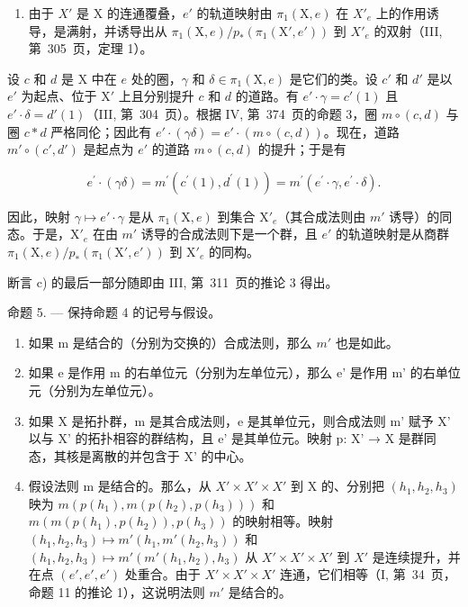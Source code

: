 \begin{enumerate}
\def\labelenumi{\alph{enumi})}
\setcounter{enumi}{2}
\tightlist
\item
  由于 \(X'\) 是 X 的连通覆叠，\(e'\) 的轨道映射由 \(\pi_{1}(\mathrm{X},e)\) 在 \(X'_{e}\) 上的作用诱导，是满射，并诱导出从 \(\pi_{1}(\mathrm{X},e)/p_{*}(\pi_{1}(\mathrm{X}',e'))\) 到 \(X'_{e}\) 的双射（III, 第~305~页，定理 1）。
\end{enumerate}

设 \(c\) 和 \(d\) 是 X 中在 \(e\) 处的圈，\(\gamma\) 和 \(\delta \in \pi_1(\mathrm{X},e)\) 是它们的类。设 \(c'\) 和 \(d'\) 是以 \(e'\) 为起点、位于 \(\mathrm{X}'\) 上且分别提升 \(c\) 和 \(d\) 的道路。有 \(e' \cdot \gamma = c'(1)\) 且 \(e' \cdot \delta = d'(1)\)（III, 第~304~页）。根据 IV, 第~374~页的命题 3，圈 \(m \circ (c,d)\) 与圈 \(c*d\) 严格同伦；因此有 \(e' \cdot (\gamma\delta) = e' \cdot (m \circ (c,d))\)。现在，道路 \(m' \circ (c',d')\) 是起点为 \(e'\) 的道路 \(m \circ (c,d)\) 的提升；于是有

\[
e ^ {\prime} \cdot (\gamma \delta) = m ^ {\prime} (c ^ {\prime} (1), d ^ {\prime} (1)) = m ^ {\prime} (e ^ {\prime} \cdot \gamma , e ^ {\prime} \cdot \delta).
\]

因此，映射 \(\gamma \mapsto e' \cdot \gamma\) 是从 \(\pi_1(\mathrm{X}, e)\) 到集合 \(\mathrm{X}'_e\)（其合成法则由 \(m'\) 诱导）的同态。于是，\(\mathrm{X}'_e\) 在由 \(m'\) 诱导的合成法则下是一个群，且 \(e'\) 的轨道映射是从商群 \(\pi_1(\mathrm{X}, e)/p_*(\pi_1(\mathrm{X}', e'))\) 到 \(\mathrm{X}'_e\) 的同构。

断言 c) 的最后一部分随即由 III, 第~311~页的推论 3 得出。

命题 5. --- 保持命题 4 的记号与假设。

\begin{enumerate}
\def\labelenumi{\alph{enumi})}
\item
  如果 m 是结合的（分别为交换的）合成法则，那么 \(m'\) 也是如此。
\item
  如果 e 是作用 m 的右单位元（分别为左单位元），那么 e' 是作用 m' 的右单位元（分别为左单位元）。
\item
  如果 X 是拓扑群，m 是其合成法则，e 是其单位元，则合成法则 m' 赋予 X' 以与 X' 的拓扑相容的群结构，且 e' 是其单位元。映射 p: X' → X 是群同态，其核是离散的并包含于 X' 的中心。
\item
  假设法则 m 是结合的。那么，从 \(X' \times X' \times X'\) 到 X 的、分别把 \((h_{1}, h_{2}, h_{3})\) 映为 \(m(p(h_{1}),m(p(h_{2}),p(h_{3})))\) 和 \(m(m(p(h_{1}),p(h_{2})),p(h_{3}))\) 的映射相等。映射 \((h_{1},h_{2},h_{3})\mapsto m'(h_{1},m'(h_{2},h_{3}))\) 和 \((h_{1},h_{2},h_{3})\mapsto m'(m'(h_{1},h_{2}),h_{3})\) 从 \(X'\times X'\times X'\) 到 \(X'\) 是连续提升，并在点 \((e',e',e')\) 处重合。由于 \(X'\times X'\times X'\) 连通，它们相等（I, 第~34~页，命题 11 的推论 1），这说明法则 \(m'\) 是结合的。
\end{enumerate}


